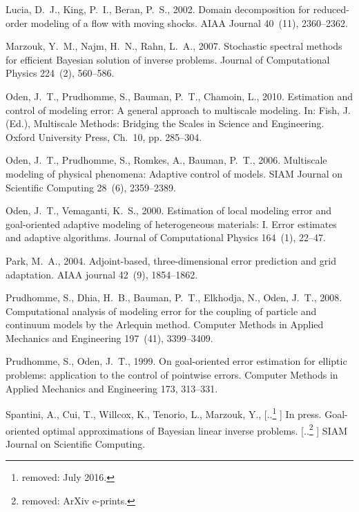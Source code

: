 \documentclass[review,sort&compress]{elsarticle}
\theoremstyle{plain} %
\theoremstyle{definition} %
\providecommand{\DIFaddtex}[1]{{\protect\color{blue} \sf #1}} %
\providecommand{\DIFdeltex}[1]{{\protect\color{red} [..\footnote{removed: #1} ]}} %
\providecommand{\DIFaddbegin}{} %
\providecommand{\DIFaddend}{} %
\providecommand{\DIFdelbegin}{} %
\providecommand{\DIFdelend}{} %
\providecommand{\DIFadd}[1]{\texorpdfstring{\DIFaddtex{#1}}{#1}} %
\providecommand{\DIFdel}[1]{\texorpdfstring{\DIFdeltex{#1}}{}} %
\newcommand{\DIFscaledelfig}{0.5}
\newlength{\DIFdelgraphicswidth} %
\newlength{\DIFdelgraphicsheight} %
\newcommand{\DIFaddincludegraphics}[2][]{{\color{blue}\fbox{\DIFOincludegraphics[#1]{#2}}}} %
\newcommand{\DIFdelincludegraphics}[2][]{%
\sbox{\DIFdelgraphicsbox}{\DIFOincludegraphics[#1]{#2}}%
\settoboxwidth{\DIFdelgraphicswidth}{\DIFdelgraphicsbox} %
\settoboxtotalheight{\DIFdelgraphicsheight}{\DIFdelgraphicsbox} %
\scalebox{\DIFscaledelfig}{%
\parbox[b]{\DIFdelgraphicswidth}{\usebox{\DIFdelgraphicsbox}\\[-\baselineskip] \rule{\DIFdelgraphicswidth}{0em}}\llap{\resizebox{\DIFdelgraphicswidth}{\DIFdelgraphicsheight}{%
\setlength{\unitlength}{\DIFdelgraphicswidth}%
\begin{picture}(1,1)%
\thicklines\linethickness{2pt} %
{\color[rgb]{1,0,0}\put(0,0){\framebox(1,1){}}}%
{\color[rgb]{1,0,0}\put(0,0){\line( 1,1){1}}}%
{\color[rgb]{1,0,0}\put(0,1){\line(1,-1){1}}}%
\end{picture}%
}\hspace*{3pt}}} %
} %
\DeclareRobustCommand{\DIFaddbegin}{\DIFOaddbegin \let\includegraphics\DIFaddincludegraphics} %
\DeclareRobustCommand{\DIFaddend}{\DIFOaddend \let\includegraphics\DIFOincludegraphics} %
\DeclareRobustCommand{\DIFdelbegin}{\DIFOdelbegin \let\includegraphics\DIFdelincludegraphics} %
\DeclareRobustCommand{\DIFdelend}{\DIFOaddend \let\includegraphics\DIFOincludegraphics} %
\begin{document}
\begin{thebibliography}{42}
Lucia, D.~J., King, P.~I., Beran, P.~S., 2002. Domain decomposition for
  reduced-order modeling of a flow with moving shocks. AIAA Journal 40~(11),
  2360--2362.

Marzouk, Y.~M., Najm, H.~N., Rahn, L.~A., 2007. Stochastic spectral methods for
  efficient {B}ayesian solution of inverse problems. Journal of Computational
  Physics 224~(2), 560--586.

Oden, J.~T., Prudhomme, S., Bauman, P.~T., Chamoin, L., 2010. Estimation and
  control of modeling error: A general approach to multiscale modeling. In:
  Fish, J. (Ed.), Multiscale Methods: Bridging the Scales in Science and
  Engineering. Oxford University Press, Ch.~10, pp. 285--304.

Oden, J.~T., Prudhomme, S., Romkes, A., Bauman, P.~T., 2006. Multiscale
  modeling of physical phenomena: Adaptive control of models. SIAM Journal on
  Scientific Computing 28~(6), 2359--2389.

Oden, J.~T., Vemaganti, K.~S., 2000. Estimation of local modeling error and
  goal-oriented adaptive modeling of heterogeneous materials: {I}. {E}rror
  estimates and adaptive algorithms. Journal of Computational Physics 164~(1),
  22--47.

Park, M.~A., 2004. Adjoint-based, three-dimensional error prediction and grid
  adaptation. AIAA journal 42~(9), 1854--1862.

Prudhomme, S., Dhia, H.~B., Bauman, P.~T., Elkhodja, N., Oden, J.~T., 2008.
  Computational analysis of modeling error for the coupling of particle and
  continuum models by the {A}rlequin method. Computer Methods in Applied
  Mechanics and Engineering 197~(41), 3399--3409.

Prudhomme, S., Oden, J.~T., 1999. On goal-oriented error estimation for
  elliptic problems: application to the control of pointwise errors. Computer
  Methods in Applied Mechanics and Engineering 173, 313--331.

\DIFdelbegin %
\DIFdelend \DIFaddbegin {}
\DIFaddend Spantini, A., Cui, T., Willcox, K., Tenorio, L., Marzouk, Y., \DIFdelbegin \DIFdel{July 2016.
  }\DIFdelend \DIFaddbegin \DIFadd{In press.
  }\DIFaddend Goal-oriented optimal approximations of {B}ayesian linear inverse problems.
  \DIFdelbegin \DIFdel{ArXiv e-prints.
}%
\DIFdelend \DIFaddbegin \DIFadd{SIAM Journal on Scientific Computing.
}\DIFaddend 


\end{thebibliography}
\end{document}
